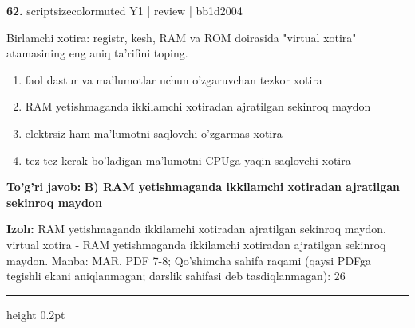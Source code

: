 \documentclass[10pt,a4paper]{article}
\begin{document}
{\bfseries\sffamily\color{ink} 62.} {scriptsizecolor{muted} Y1 | review | bb1d2004}
\par
Birlamchi xotira: registr, kesh, RAM va ROM doirasida "virtual xotira" atamasining eng aniq ta'rifini toping.
\begin{enumerate}[label=\Alph*),leftmargin=9mm]
\item faol dastur va ma'lumotlar uchun o'zgaruvchan tezkor xotira
\item RAM yetishmaganda ikkilamchi xotiradan ajratilgan sekinroq maydon
\item elektrsiz ham ma'lumotni saqlovchi o'zgarmas xotira
\item tez-tez kerak bo'ladigan ma'lumotni CPUga yaqin saqlovchi xotira
\end{enumerate}
\begin{tcolorbox}[enhanced,breakable,colback=teal!4,colframe=teal!60!black,boxrule=0.45pt,arc=1.2mm,left=2.7mm,right=2.7mm,top=1.8mm,bottom=1.8mm,before skip=2mm,after skip=2mm]
{\bfseries\sffamily\color{teal}To'g'ri javob:} \textbf{B) RAM yetishmaganda ikkilamchi xotiradan ajratilgan sekinroq maydon}
\par\smallskip
{\bfseries Izoh:} RAM yetishmaganda ikkilamchi xotiradan ajratilgan sekinroq maydon. virtual xotira - RAM yetishmaganda ikkilamchi xotiradan ajratilgan sekinroq maydon. Manba: MAR, PDF 7-8; Qo'shimcha sahifa raqami (qaysi PDFga tegishli ekani aniqlanmagan; darslik sahifasi deb tasdiqlanmagan): 26
\end{tcolorbox}
\vspace{2mm}\hrule height 0.2pt\vspace{3mm}
\end{document}
